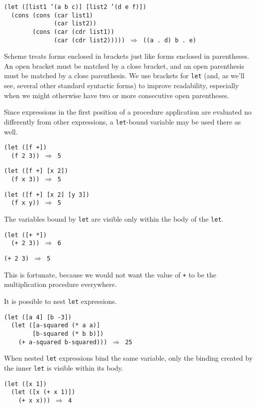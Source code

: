 \begin{alltt}
(let ([list1 '(a b c)] [list2 '(d e f)])
  (cons (cons (car list1)
              (car list2))
        (cons (car (cdr list1))
              (car (cdr list2))))) \(\Rightarrow\) ((a . d) b . e)
\end{alltt}


Scheme treats forms enclosed in brackets just like forms enclosed in
parentheses.
An open bracket must be matched by a close bracket, and an open
parenthesis must be matched by a close parenthesis.
We use brackets for \texttt{let} (and, as we'll see, several other
standard syntactic forms) to improve readability, especially when we might
otherwise have two or more consecutive open parentheses.


Since expressions in the first position of a procedure application
are evaluated no differently from other expressions, a \texttt{let}-bound
variable may be used there as well.


\begin{alltt}
(let ([f +])
  (f 2 3)) \(\Rightarrow\) 5

(let ([f +] [x 2])
  (f x 3)) \(\Rightarrow\) 5

(let ([f +] [x 2] [y 3])
  (f x y)) \(\Rightarrow\) 5
\end{alltt}


The variables bound by \texttt{let} are visible only within the body of 
the \texttt{let}.


\begin{alltt}
(let ([+ *])
  (+ 2 3)) \(\Rightarrow\) 6

(+ 2 3) \(\Rightarrow\) 5
\end{alltt}


This is fortunate, because we would not want the
value of \texttt{+} to be the multiplication procedure everywhere.


It is possible to nest \texttt{let} expressions.


\begin{alltt}
(let ([a 4] [b -3])
  (let ([a-squared (* a a)]
        [b-squared (* b b)])
    (+ a-squared b-squared))) \(\Rightarrow\) 25
\end{alltt}


When nested \texttt{let} expressions bind the same variable, only the 
binding created by the inner \texttt{let} is visible within its body.


\begin{alltt}
(let ([x 1])
  (let ([x (+ x 1)])
    (+ x x))) \(\Rightarrow\) 4
\end{alltt}


